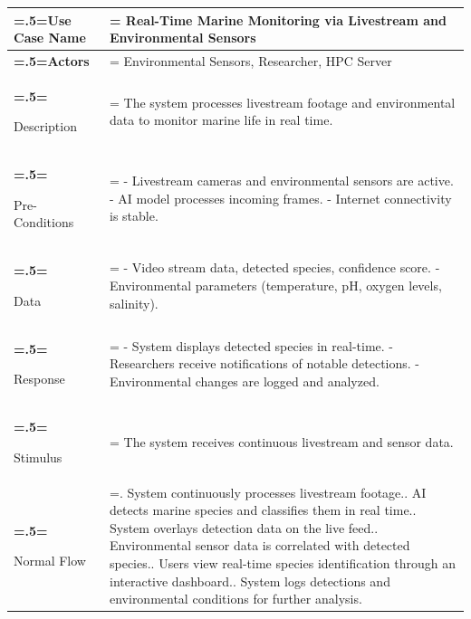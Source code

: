 \begin{table}[H] 
  \centering
  \footnotesize
  \begin{tabularx}{\textwidth}{|>{\bfseries\hsize=.5\hsize\linewidth=\hsize}X|
  >{\hsize=1.5\hsize\linewidth=\hsize}X|}
  \hline
  Use Case Name       & Real-Time Marine Monitoring via Livestream and Environmental Sensors \\ \hline
  
  Actors              & Environmental Sensors, Researcher, HPC Server \\ \hline
  
  Description         & The system processes livestream footage and environmental data to monitor marine life in real time. \\ \hline
  
  Pre-Conditions      & 
  - Livestream cameras and environmental sensors are active.\newline
  - AI model processes incoming frames.\newline
  - Internet connectivity is stable. \\ \hline
  
  Data                & 
  - Video stream data, detected species, confidence score.\newline
  - Environmental parameters (temperature, pH, oxygen levels, salinity). \\ \hline
  
  Response            & 
  - System displays detected species in real-time.\newline
  - Researchers receive notifications of notable detections.\newline
  - Environmental changes are logged and analyzed. \\ \hline
  
  Stimulus            & The system receives continuous livestream and sensor data. \\ \hline
  
  Normal Flow         & 
  1. System continuously processes livestream footage.\newline
  2. AI detects marine species and classifies them in real time.\newline
  3. System overlays detection data on the live feed.\newline
  4. Environmental sensor data is correlated with detected species.\newline
  5. Users view real-time species identification through an interactive dashboard.\newline
  6. System logs detections and environmental conditions for further analysis. \\ \hline
  

\end{tabularx}
\end{table}
